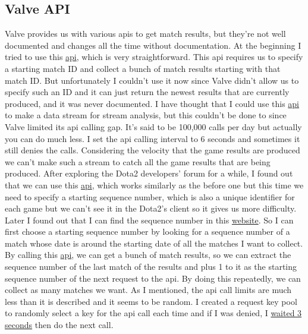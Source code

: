 \documentclass{article}
\begin{document}
\subsection{Valve API}
Valve provides us with various apis to get match results, but they're not well documented and changes all the time without documentation. At the beginning I tried to use this \href{https://wiki.teamfortress.com/wiki/WebAPI/GetMatchHistory}{api}, which is very straightforward. This api requires us to specify a starting match ID and collect a bunch of match results starting with that match ID. But unfortunately I couldn't use it now since Valve didn't allow us to specify such an ID and it can just return the newest results that are currently produced, and it was never documented. I have thought that I could use this \href{https://wiki.teamfortress.com/wiki/WebAPI/GetMatchHistory}{api} to make a data stream for stream analysis, but this couldn't be done to since Valve limited its api calling gap. It's said to be 100,000 calls per day but actually you can do much less. I set the api calling interval to 6 seconds and sometimes it still denies the calls. Considering the velocity that the game results are produced we can't make such a stream to catch all the game results that are being produced. After exploring the Dota2 developers' forum for a while, I found out that we can use this  \href{https://wiki.teamfortress.com/wiki/WebAPI/GetMatchHistoryBySequenceNum}{api}, which works similarly as the before one but this time we need to specify a starting sequence number, which is also a unique identifier for each game but we can't see it in the Dota2's client so it gives us more difficulty. Later I found out that I can find the sequence number in this \href{https://wiki.teamfortress.com/wiki/WebAPI/GetMatchHistoryBySequenceNum}{website}. So I can first choose a starting sequence number by looking for a sequence number of a match whose date is around the starting date of all the matches I want to collect.  By calling this \href{https://wiki.teamfortress.com/wiki/WebAPI/GetMatchHistoryBySequenceNum}{api}, we can get a bunch of match results, so we can extract the sequence number of the last match of the results and plus 1 to it as the starting sequence number of the next request to the api. By doing this repeatedly, we can collect as many matches we want. As I mentioned, the api call limits are much less than it is described and it seems to be random. I created a request key pool to randomly select a key for the api call each time and if I was denied, I \href{https://github.com/Vopaaz/big-data-psg-lgd/blob/a9a285e0e29c0d9e56b41994875df830c7e7b51b/src/main/java/FetchStore/ValveAPI.java#L241-L249}{waited 3 seconds} then do the next call.
\end{document}
